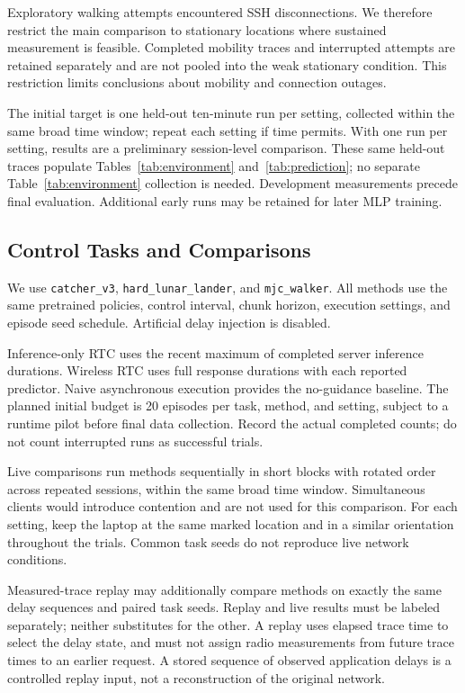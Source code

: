 \documentclass[11pt]{article}
\newcommand{\task}[1]{\texttt{#1}}
\begin{document}
Exploratory walking attempts encountered SSH disconnections. We therefore restrict the main comparison to stationary locations where sustained measurement is feasible. Completed mobility traces and interrupted attempts are retained separately and are not pooled into the weak stationary condition. This restriction limits conclusions about mobility and connection outages.

The initial target is one held-out ten-minute run per setting, collected within the same broad time window; repeat each setting if time permits. With one run per setting, results are a preliminary session-level comparison. These same held-out traces populate Tables~\ref{tab:environment} and~\ref{tab:prediction}; no separate Table~\ref{tab:environment} collection is needed. Development measurements precede final evaluation. Additional early runs may be retained for later MLP training.

\subsection{Control Tasks and Comparisons}
We use \task{catcher\_v3}, \task{hard\_lunar\_lander}, and \task{mjc\_walker}. All methods use the same pretrained policies, control interval, chunk horizon, execution settings, and episode seed schedule. Artificial delay injection is disabled.

Inference-only RTC uses the recent maximum of completed server inference durations. Wireless RTC uses full response durations with each reported predictor. Naive asynchronous execution provides the no-guidance baseline. The planned initial budget is 20 episodes per task, method, and setting, subject to a runtime pilot before final data collection. Record the actual completed counts; do not count interrupted runs as successful trials.

Live comparisons run methods sequentially in short blocks with rotated order across repeated sessions, within the same broad time window. Simultaneous clients would introduce contention and are not used for this comparison. For each setting, keep the laptop at the same marked location and in a similar orientation throughout the trials. Common task seeds do not reproduce live network conditions.

Measured-trace replay may additionally compare methods on exactly the same delay sequences and paired task seeds. Replay and live results must be labeled separately; neither substitutes for the other. A replay uses elapsed trace time to select the delay state, and must not assign radio measurements from future trace times to an earlier request. A stored sequence of observed application delays is a controlled replay input, not a reconstruction of the original network.
\end{document}
